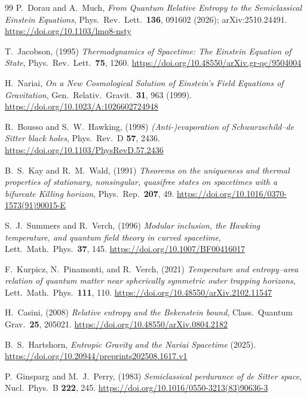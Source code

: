 \documentclass[11pt]{article}
\begin{document}
\begingroup
\footnotesize
\begin{thebibliography}{99}\setlength{\itemsep}{1pt}\setlength{\parskip}{0pt}
 P.~Dorau and A.~Much, \emph{From Quantum Relative Entropy to the Semiclassical Einstein Equations}, Phys.\ Rev.\ Lett.\ \textbf{136}, 091602 (2026); arXiv:2510.24491.
\url{https://doi.org/10.1103/lmq8-nsty}

 T.~Jacobson, (1995) \emph{Thermodynamics of Spacetime: The Einstein Equation of State}, Phys.\ Rev.\ Lett.\ \textbf{75}, 1260.
\url{https://doi.org/10.48550/arXiv.gr-qc/9504004}

 H.~Nariai, \emph{On a New Cosmological Solution of Einstein's Field Equations of Gravitation}, Gen.\ Relativ.\ Gravit.\ \textbf{31}, 963 (1999). \url{https://doi.org/10.1023/A:1026602724948}

 R.~Bousso and S.~W.~Hawking, (1998) \emph{(Anti-)evaporation of Schwarzschild--de Sitter black holes}, Phys.\ Rev.\ D \textbf{57}, 2436.
\url{https://doi.org/10.1103/PhysRevD.57.2436}

 B.~S.~Kay and R.~M.~Wald, (1991) \emph{Theorems on the uniqueness and thermal properties of stationary, nonsingular, quasifree states on spacetimes with a bifurcate Killing horizon}, Phys.\ Rep.\ \textbf{207}, 49.
\url{https://doi.org/10.1016/0370-1573(91)90015-E}

 S.~J.~Summers and R.~Verch, (1996) \emph{Modular inclusion, the Hawking temperature, and quantum field theory in curved spacetime}, Lett.\ Math.\ Phys.\ \textbf{37}, 145.
\url{https://doi.org/10.1007/BF00416017}

 F.~Kurpicz, N.~Pinamonti, and R.~Verch, (2021) \emph{Temperature and entropy--area relation of quantum matter near spherically symmetric outer trapping horizons}, Lett.\ Math.\ Phys.\ \textbf{111}, 110.
\url{https://doi.org/10.48550/arXiv.2102.11547}

 H.~Casini, (2008) \emph{Relative entropy and the Bekenstein bound}, Class.\ Quantum Grav.\ \textbf{25}, 205021. \url{https://doi.org/10.48550/arXiv.0804.2182}

 B.~S.~Hartshorn, \emph{Entropic Gravity and the Nariai Spacetime} (2025). \url{https://doi.org/10.20944/preprints202508.1617.v1}

 P.~Ginsparg and M.~J.~Perry, (1983) \emph{Semiclassical perdurance of de Sitter space}, Nucl.\ Phys.\ B \textbf{222}, 245.
\url{https://doi.org/10.1016/0550-3213(83)90636-3}


\end{thebibliography}
\end{document}
